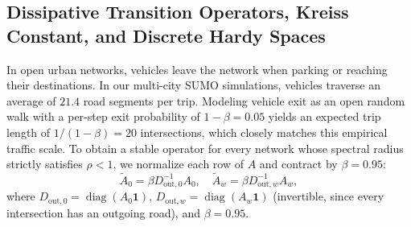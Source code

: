 \documentclass[journal]{IEEEtran}
\begin{document}
\begin{table}[htbp]
\caption{Mathematical Spectral Operators and Traffic Network Interpretations}
\label{tab:operator_hydro}
\centering
{}
\end{table}

\subsection{Dissipative Transition Operators, Kreiss Constant, and Discrete Hardy Spaces}
In open urban networks, vehicles leave the network when parking or reaching their destinations. In our multi-city SUMO simulations, vehicles traverse an average of $21.4$ road segments per trip. Modeling vehicle exit as an open random walk with a per-step exit probability of $1 - \beta = 0.05$ yields an expected trip length of $1 / (1 - \beta) = 20$ intersections, which closely matches this empirical traffic scale. To obtain a stable operator for every network whose spectral radius strictly satisfies $\rho < 1$, we normalize each row of $A$ and contract by $\beta = 0.95$:
\begin{equation}
\tilde{A}_0 = \beta D_{\text{out}, 0}^{-1} A_0, \quad \tilde{A}_w = \beta D_{\text{out}, w}^{-1} A_w,
\label{eq:normalized_A}
\end{equation}
where $D_{\text{out}, 0} = \operatorname{diag}(A_0 \mathbf{1})$, $D_{\text{out}, w} = \operatorname{diag}(A_w \mathbf{1})$ (invertible, since every intersection has an outgoing road), and $\beta = 0.95$.
\end{document}
